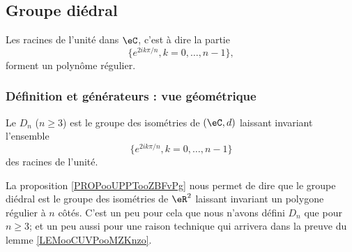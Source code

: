 \subsection{Groupe diédral}
\label{subsecHibJId}

\begin{proposition}     \label{PROPooUPPTooZBFvPg}
    Les racines de l'unité dans \( \eC\), c'est à dire la partie
    \begin{equation}
        \{  e^{2ik\pi/n},k=0,\ldots, n-1 \},
    \end{equation}
    forment un polynôme régulier.
\end{proposition}

\subsubsection{Définition et générateurs : vue géométrique}

\begin{definition}  \label{DEFooIWZGooAinSOh}
    Le  \( D_n\) (\( n\geq 3\)) est le groupe des isométries de \( (\eC,d)\) laissant invariant l'ensemble
    \begin{equation}
        \{  e^{2ik\pi/n},k=0,\ldots, n-1 \}
    \end{equation}
    des racines de l'unité.
\end{definition}

\begin{normaltext}
    La proposition \ref{PROPooUPPTooZBFvPg} nous permet de dire que le groupe diédral est le groupe des isométries de \( \eR^2\) laissant invariant un polygone régulier à \( n\) côtés.
    C'est un peu pour cela que nous n'avons défini \( D_n\) que pour \( n\geq 3\); et un peu aussi pour une raison technique qui arrivera dans la preuve du lemme \ref{LEMooCUVPooMZKnzo}.
\end{normaltext}


